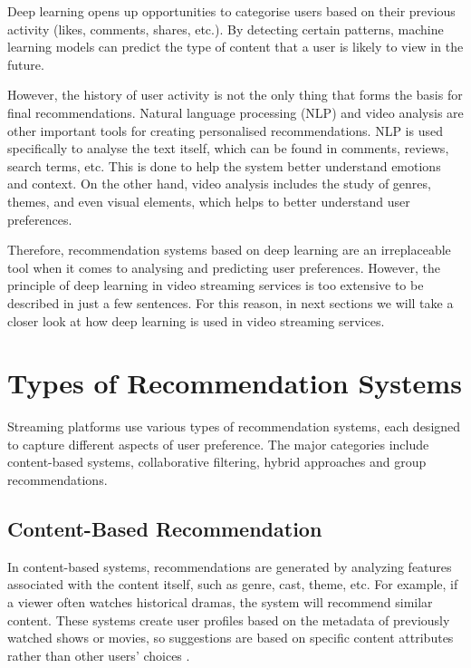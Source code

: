 \documentclass[12pt,english,a4paper]{article}
\begin{document}
Deep learning opens up opportunities to categorise users based on their previous activity (likes, comments, shares, etc.). By detecting certain patterns, machine learning models can predict the type of content that a user is likely to view in the future.

However, the history of user activity is not the only thing that forms the basis for final recommendations. Natural language processing (NLP) and video analysis are other important tools for creating personalised recommendations. NLP is used specifically to analyse the text itself, which can be found in comments, reviews, search terms, etc. This is done to help the system better understand emotions and context. On the other hand, video analysis includes the study of genres, themes, and even visual elements, which helps to better understand user preferences.

Therefore, recommendation systems based on deep learning are an irreplaceable tool when it comes to analysing and predicting user preferences. However, the principle of deep learning in video streaming services is too extensive to be described in just a few sentences. For this reason, in next sections we will take a closer look at how deep learning is used in video streaming services.

\section{Types of Recommendation Systems}

\hspace*{2em}Streaming platforms use various types of recommendation systems, each designed to capture different aspects of user preference. The major categories include content-based systems, collaborative filtering, hybrid approaches and group recommendations.

\subsection{Content-Based Recommendation}

\hspace*{2em}In content-based systems, recommendations are generated by analyzing features associated with the content itself, such as genre, cast, theme, etc. For example, if a viewer often watches historical dramas, the system will recommend similar content. These systems create user profiles based on the metadata of previously watched shows or movies, so suggestions are based on specific content attributes rather than other users’ choices \cite{Lubos2023,Peng2024}.
\end{document}
